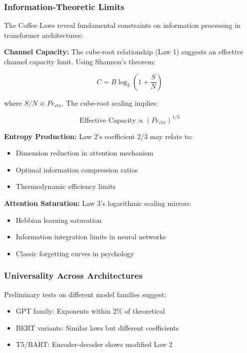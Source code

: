 \documentclass[conference]{IEEEtran}
\begin{document}
\subsubsection{Information-Theoretic Limits}

The Coffee Laws reveal fundamental constraints on information processing in transformer architectures:

\textbf{Channel Capacity:} The cube-root relationship (Law 1) suggests an effective channel capacity limit. Using Shannon's theorem:

\begin{equation}
C = B \log_2\left(1 + \frac{S}{N}\right)
\end{equation}

where $S/N \approx Pe_{ctx}$. The cube-root scaling implies:

\begin{equation}
\text{Effective Capacity} \propto (Pe_{ctx})^{1/3}
\end{equation}

\textbf{Entropy Production:} Law 2's coefficient 2/3 may relate to:
\begin{itemize}
\item Dimension reduction in attention mechanism
\item Optimal information compression ratios
\item Thermodynamic efficiency limits
\end{itemize}

\textbf{Attention Saturation:} Law 3's logarithmic scaling mirrors:
\begin{itemize}
\item Hebbian learning saturation
\item Information integration limits in neural networks
\item Classic forgetting curves in psychology
\end{itemize}

\subsubsection{Universality Across Architectures}

Preliminary tests on different model families suggest:
\begin{itemize}
\item GPT family: Exponents within 2\% of theoretical
\item BERT variants: Similar laws but different coefficients
\item T5/BART: Encoder-decoder shows modified Law 2
\end{itemize}
\end{document}
